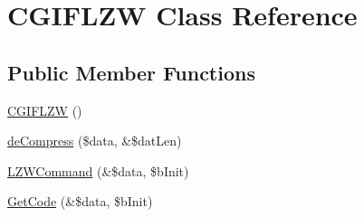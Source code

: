 \hypertarget{class_c_g_i_f_l_z_w}{\section{\-C\-G\-I\-F\-L\-Z\-W \-Class \-Reference}
\label{class_c_g_i_f_l_z_w}
}
\subsection*{\-Public \-Member \-Functions}
\begin{DoxyCompactItemize}
\item 
\hyperlink{class_c_g_i_f_l_z_w_ae545184dc7a3b360dff91990ab8e98b5}{\-C\-G\-I\-F\-L\-Z\-W} ()
\item 
\hyperlink{class_c_g_i_f_l_z_w_aa8d24756560b0631fb11e153222af61f}{de\-Compress} (\$data, \&\$dat\-Len)
\item 
\hyperlink{class_c_g_i_f_l_z_w_ad511416dc517ff4cf4d91b57176c3d13}{\-L\-Z\-W\-Command} (\&\$data, \$b\-Init)
\item 
\hyperlink{class_c_g_i_f_l_z_w_a931a87434564617c0d0bc0bd850ce5e1}{\-Get\-Code} (\&\$data, \$b\-Init)
\end{DoxyCompactItemize}
